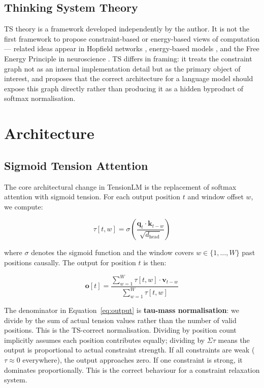 \documentclass[10pt,a4paper]{article}
\begin{document}
\subsection{Thinking System Theory}

TS theory is a framework developed independently by the author. It is not the first framework to propose constraint-based or energy-based views of computation --- related ideas appear in Hopfield networks \cite{hopfield1982neural}, energy-based models \cite{lecun2006tutorial}, and the Free Energy Principle in neuroscience \cite{friston2010free}. TS differs in framing: it treats the constraint graph not as an internal implementation detail but as the primary object of interest, and proposes that the correct architecture for a language model should expose this graph directly rather than producing it as a hidden byproduct of softmax normalisation.

\section{Architecture}

\subsection{Sigmoid Tension Attention}

The core architectural change in TensionLM is the replacement of softmax attention with sigmoid tension. For each output position $t$ and window offset $w$, we compute:

\begin{equation}
    \tau[t, w] = \sigma\!\left(\frac{\mathbf{q}_t \cdot \mathbf{k}_{t-w}}{\sqrt{d_{\text{head}}}}\right)
    \label{eq:tau}
\end{equation}

where $\sigma$ denotes the sigmoid function and the window covers $w \in \{1, \ldots, W\}$ past positions causally. The output for position $t$ is then:

\begin{equation}
    \mathbf{o}[t] = \frac{\displaystyle\sum_{w=1}^{W} \tau[t,w] \cdot \mathbf{v}_{t-w}}{\displaystyle\sum_{w=1}^{W} \tau[t,w]}
    \label{eq:output}
\end{equation}

The denominator in Equation~\ref{eq:output} is \textbf{tau-mass normalisation}: we divide by the sum of actual tension values rather than the number of valid positions. This is the TS-correct normalisation. Dividing by position count implicitly assumes each position contributes equally; dividing by $\Sigma\tau$ means the output is proportional to actual constraint strength. If all constraints are weak ($\tau \approx 0$ everywhere), the output approaches zero. If one constraint is strong, it dominates proportionally. This is the correct behaviour for a constraint relaxation system.
\end{document}
